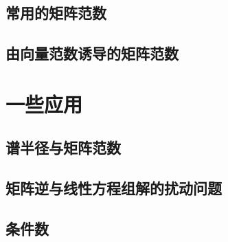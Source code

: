 \begin{definition}[]
\end{definition}

\begin{definition}[]
\end{definition}

\begin{definition}[]
\end{definition}

\subsection{常用的矩阵范数}
\label{sub:常用的矩阵范数}

\begin{definition}[]
\end{definition}

\subsection{由向量范数诱导的矩阵范数}
\label{sub:由向量范数诱导的矩阵范数}

\begin{definition}[]
\end{definition}

\section{一些应用}
\label{sec:一些应用}

\subsection{谱半径与矩阵范数}
\label{sub:谱半径与矩阵范数}

\subsection{矩阵逆与线性方程组解的扰动问题}
\label{sub:矩阵逆与线性方程组解的扰动问题}

\subsection{条件数}
\label{sub:条件数}

\begin{definition}[]
\end{definition}

